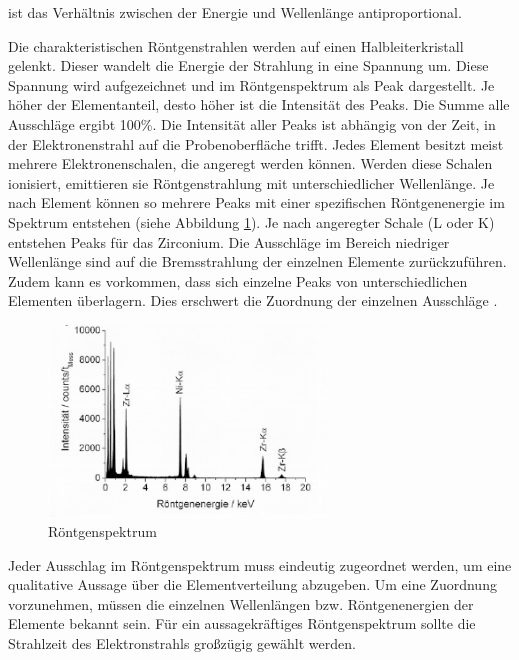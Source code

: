 \documentclass[a4paper, 11pt]{tubsreprt}
\begin{document}
ist das Verhältnis zwischen der Energie und Wellenlänge antiproportional.


Die charakteristischen Röntgenstrahlen werden auf einen Halbleiterkristall gelenkt. Dieser wandelt die Energie der Strahlung in eine Spannung um. Diese Spannung wird aufgezeichnet und im Röntgenspektrum als Peak dargestellt. Je höher der Elementanteil, desto höher ist die Intensität des Peaks. Die Summe alle Ausschläge ergibt 100\%. Die Intensität aller Peaks ist abhängig von der Zeit, in der Elektronenstrahl auf die Probenoberfläche trifft. 
Jedes Element besitzt meist mehrere Elektronenschalen, die angeregt werden können. Werden diese Schalen ionisiert, emittieren sie Röntgenstrahlung mit unterschiedlicher Wellenlänge. Je nach Element können so mehrere Peaks mit einer spezifischen Röntgenenergie im Spektrum entstehen (siehe Abbildung \ref{Röntgenspektrum}). Je nach angeregter Schale (L oder K) entstehen Peaks für das Zirconium. Die Ausschläge im Bereich niedriger Wellenlänge sind auf die Bremsstrahlung der einzelnen Elemente zurückzuführen. Zudem kann es vorkommen, dass sich einzelne Peaks von unterschiedlichen Elementen überlagern. Dies erschwert die Zuordnung der einzelnen Ausschläge \cite[vgl.]{Gemming2013}. 

\begin{figure}
\centering
\includegraphics[width=0.66\textwidth]{Bilder/Roentgenspektrum.png}
\caption[Röntgenspektrum]{Röntgenspektrum \cite{Gemming2013}}
\label{Röntgenspektrum}
\end{figure}

Jeder Ausschlag im Röntgenspektrum muss eindeutig zugeordnet werden, um eine qualitative Aussage über die Elementverteilung abzugeben. Um eine Zuordnung vorzunehmen, müssen die einzelnen Wellenlängen bzw. Röntgenenergien der Elemente bekannt sein. Für ein aussagekräftiges Röntgenspektrum sollte die Strahlzeit des Elektronstrahls großzügig gewählt werden.   
\end{document}
